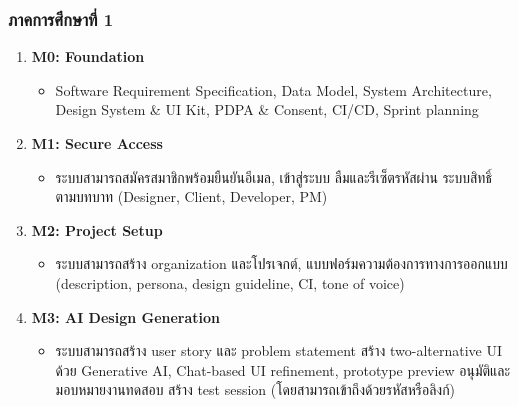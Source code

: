 \subsubsection{ภาคการศึกษาที่ 1}
\begin{enumerate}
  \item \textbf{M0: Foundation}
    \begin{itemize}
      \item Software Requirement Specification, Data Model, System Architecture, Design System \& UI Kit, PDPA \& Consent, CI/CD, Sprint planning
    \end{itemize}
  \item \textbf{M1: Secure Access}
    \begin{itemize}
      \item ระบบสามารถสมัครสมาชิกพร้อมยืนยันอีเมล, เข้าสู่ระบบ ลืมและรีเซ็ตรหัสผ่าน ระบบสิทธิ์ตามบทบาท (Designer, Client, Developer, PM)
    \end{itemize}
  \item \textbf{M2: Project Setup}
    \begin{itemize}
      \item ระบบสามารถสร้าง organization และโปรเจกต์, แบบฟอร์มความต้องการทางการออกแบบ (description, persona, design guideline, CI, tone of voice)
    \end{itemize}
  \item \textbf{M3: AI Design Generation}
    \begin{itemize}
      \item ระบบสามารถสร้าง user story และ problem statement สร้าง two-alternative UI ด้วย Generative AI, Chat-based UI refinement, prototype preview อนุมัติและมอบหมายงานทดสอบ สร้าง test session (โดยสามารถเข้าถึงด้วยรหัสหรือลิงก์)
    \end{itemize}
\end{enumerate}

